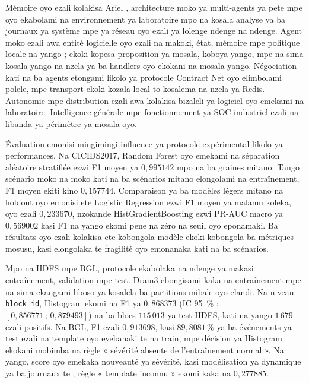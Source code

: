 
Mémoire oyo ezali kolakisa Ariel \logminer{}, architecture moko ya
multi-agents ya pete mpe oyo ekabolami na environnement ya laboratoire
mpo na kosala analyse ya ba journaux ya système mpe ya réseau oyo ezali
ya lolenge ndenge na ndenge. Agent moko ezali awa entité logicielle oyo
ezali na makoki, état, mémoire mpe politique locale na yango ; ekoki
kopesa proposition ya mosala, koboya yango, mpe na sima kosala yango na
nzela ya ba handlers oyo ekokani na mosala yango. Négociation kati na
ba agents etongami likolo ya protocole Contract Net oyo elimbolami
polele, mpe transport ekoki kozala local to kosalema na nzela ya Redis.
Autonomie mpe distribution ezali awa kolakisa bizaleli ya logiciel oyo
emekami na laboratoire. Intelligence générale mpe fonctionnement ya SOC
industriel ezali na libanda ya périmètre ya mosala oyo.

Évaluation emonisi mingimingi influence ya protocole expérimental likolo
ya performances. Na CICIDS2017, Random Forest oyo emekami na séparation
aléatoire stratifiée ezwi F1 moyen ya $0{,}995142$ mpo na ba graines
mitano. Tango scénario moko na moko kati na ba scénarios mitano
elongolami na entraînement, F1 moyen ekiti kino $0{,}157744$.
Comparaison ya ba modèles légers mitano na holdout oyo emonisi ete
Logistic Regression ezwi F1 moyen ya malamu koleka, oyo ezali
$0{,}233670$, nzokande HistGradientBoosting ezwi PR-AUC macro ya
$0{,}569002$ kasi F1 na yango ekomi pene na zéro na seuil oyo eponamaki.
Ba résultats oyo ezali kolakisa ete kobongola modèle ekoki kobongola ba
métriques mosusu, kasi elongolaka te fragilité oyo emonanaka kati na ba
scénarios.

Mpo na HDFS mpe BGL, protocole ekabolaka na ndenge ya makasi entraînement,
validation mpe test. Drain3 ebongisami kaka na entraînement mpe na sima
ekangami liboso ya kosalela ba partitions mibale oyo elandi. Na niveau
\texttt{block\_id}, Histogram ekomi na F1 ya $0{,}868373$ (IC 95~\% :
$[0{,}856771\,;\,0{,}879493]$) na ba blocs $115\,013$ ya test HDFS,
kati na yango $1\,679$ ezali positifs. Na BGL, F1 ezali $0{,}913698$, kasi
$89{,}8081\,\%$ ya ba événements ya test ezali na template oyo eyebanaki
te na train, mpe décision ya Histogram ekokani mobimba na règle
« sévérité absente de l'entraînement normal ». Na yango, score oyo emekaka
nouveauté ya sévérité, kasi modélisation ya dynamique ya ba journaux te ;
règle « template inconnu » ekomi kaka na $0{,}277885$.

